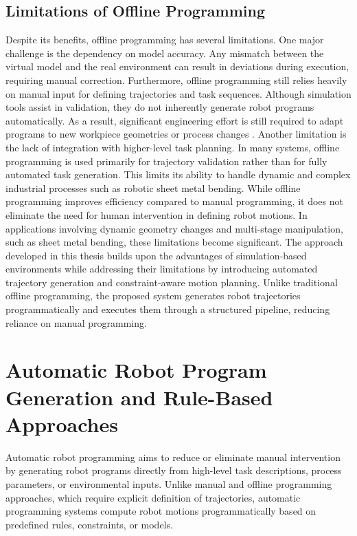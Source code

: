 \subsection{Limitations of Offline Programming}
Despite its benefits, offline programming has several limitations. One major challenge is the dependency on model accuracy. Any mismatch between the virtual model and the real environment can result in deviations during execution, requiring manual correction.
Furthermore, offline programming still relies heavily on manual input for defining trajectories and task sequences. Although simulation tools assist in validation, they do not inherently generate robot programs automatically. As a result, significant engineering effort is still required to adapt programs to new workpiece geometries or process changes \cite{Bogue2018}.
Another limitation is the lack of integration with higher-level task planning. In many systems, offline programming is used primarily for trajectory validation rather than for fully automated task generation. This limits its ability to handle dynamic and complex industrial  processes such as robotic sheet metal bending.
 While offline programming improves efficiency compared to manual programming, it does not eliminate the need for human intervention in defining robot motions. In applications involving dynamic geometry changes and multi-stage manipulation, such as sheet metal bending, these limitations become significant.
The approach developed in this thesis builds upon the advantages of simulation-based environments while addressing their limitations by introducing automated trajectory generation and constraint-aware motion planning. Unlike traditional offline programming, the proposed system generates robot trajectories programmatically and executes them through a structured pipeline, reducing reliance on manual programming.


\section{Automatic Robot Program Generation and Rule-Based Approaches}
Automatic robot programming aims to reduce or eliminate manual intervention by generating robot programs directly from high-level task descriptions, process parameters, or environmental inputs. Unlike manual and offline programming approaches, which require explicit definition of trajectories, automatic programming systems compute robot motions programmatically based on predefined rules, constraints, or models.
 
